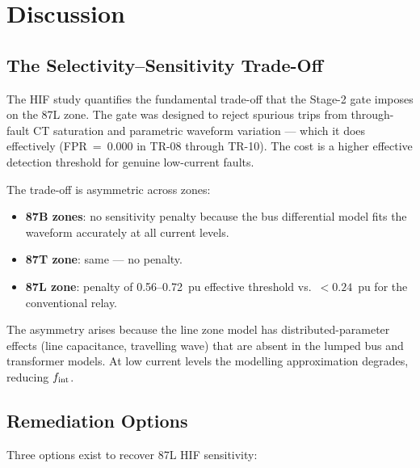 \documentclass[12pt,a4paper]{article}
\newcommand{\fint}{f_{\rm int}}
\begin{document}
\section{Discussion}

\subsection{The Selectivity--Sensitivity Trade-Off}

The HIF study quantifies the fundamental trade-off that the Stage-2
gate imposes on the 87L zone.  The gate was designed to reject spurious
trips from through-fault CT saturation and parametric waveform
variation — which it does effectively (FPR~=~0.000 in TR-08 through
TR-10).  The cost is a higher effective detection threshold for
genuine low-current faults.

The trade-off is asymmetric across zones:
\begin{itemize}[noitemsep]
  \item \textbf{87B zones}: no sensitivity penalty because the bus
    differential model fits the waveform accurately at all current levels.
  \item \textbf{87T zone}: same — no penalty.
  \item \textbf{87L zone}: penalty of 0.56--0.72~pu effective threshold
    vs.\ $< 0.24$~pu for the conventional relay.
\end{itemize}

The asymmetry arises because the line zone model has distributed-parameter
effects (line capacitance, travelling wave) that are absent in the lumped
bus and transformer models.  At low current levels the modelling
approximation degrades, reducing $\fint$.

\subsection{Remediation Options}

Three options exist to recover 87L HIF sensitivity:
\end{document}
